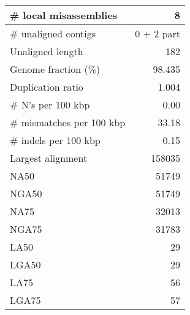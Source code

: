 \documentclass[12pt,a4paper]{article}
\begin{document}
\begin{table}[ht]
\begin{center}
\begin{tabular}{|l*{1}{|r}|}
\# local misassemblies & 8 \\ \hline
\# unaligned contigs & 0 + 2 part \\ \hline
Unaligned length & 182 \\ \hline
Genome fraction (\%) & 98.435 \\ \hline
Duplication ratio & 1.004 \\ \hline
\# N's per 100 kbp & 0.00 \\ \hline
\# mismatches per 100 kbp & 33.18 \\ \hline
\# indels per 100 kbp & 0.15 \\ \hline
Largest alignment & 158035 \\ \hline
NA50 & 51749 \\ \hline
NGA50 & 51749 \\ \hline
NA75 & 32013 \\ \hline
NGA75 & 31783 \\ \hline
LA50 & 29 \\ \hline
LGA50 & 29 \\ \hline
LA75 & 56 \\ \hline
LGA75 & 57 \\ \hline
\end{tabular}
\end{center}
\end{table}
\end{document}
